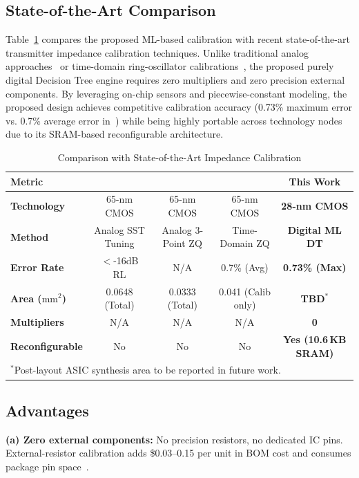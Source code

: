 \documentclass[lettersize,journal]{IEEEtran}
\begin{document}
\subsection{State-of-the-Art Comparison}
Table~\ref{tab:sota_comp} compares the proposed ML-based calibration with recent state-of-the-art transmitter impedance calibration techniques. Unlike traditional analog approaches~\cite{sota_pam4} or time-domain ring-oscillator calibrations~\cite{sota_tdzq}, the proposed purely digital Decision Tree engine requires zero multipliers and zero precision external components. By leveraging on-chip sensors and piecewise-constant modeling, the proposed design achieves competitive calibration accuracy (0.73\% maximum error vs. 0.7\% average error in~\cite{sota_tdzq}) while being highly portable across technology nodes due to its SRAM-based reconfigurable architecture.

\begin{table}[!t]
\caption{Comparison with State-of-the-Art Impedance Calibration\label{tab:sota_comp}}
\centering
\begin{tabular}{lcccc}
\toprule
\textbf{Metric} & \textbf{\cite{sota_sst}} & \textbf{\cite{sota_pam4}} & \textbf{\cite{sota_tdzq}} & \textbf{This Work} \\
\midrule
\textbf{Technology} & 65-nm CMOS & 65-nm CMOS & 65-nm CMOS & \textbf{28-nm CMOS} \\
\textbf{Method} & Analog SST Tuning & Analog 3-Point ZQ & Time-Domain ZQ & \textbf{Digital ML DT} \\
\textbf{Error Rate} & $<$-16dB RL & N/A & 0.7\% (Avg) & \textbf{0.73\% (Max)} \\
\textbf{Area ($\text{mm}^2$)} & 0.0648 (Total) & 0.0333 (Total) & 0.041 (Calib only) & \textbf{TBD$^\ast$} \\
\textbf{Multipliers} & N/A & N/A & N/A & \textbf{0} \\
\textbf{Reconfigurable} & No & No & No & \textbf{Yes (10.6\,KB SRAM)} \\
\bottomrule
\multicolumn{5}{l}{\footnotesize $^\ast$Post-layout ASIC synthesis area to be reported in future work.}
\end{tabular}
\end{table}

\subsection{Advantages}

\textbf{(a) Zero external components:} No precision resistors, no dedicated IC pins. External-resistor calibration adds \$0.03--0.15 per unit in BOM cost and consumes package pin space~\cite{imp_kim}.
\end{document}

